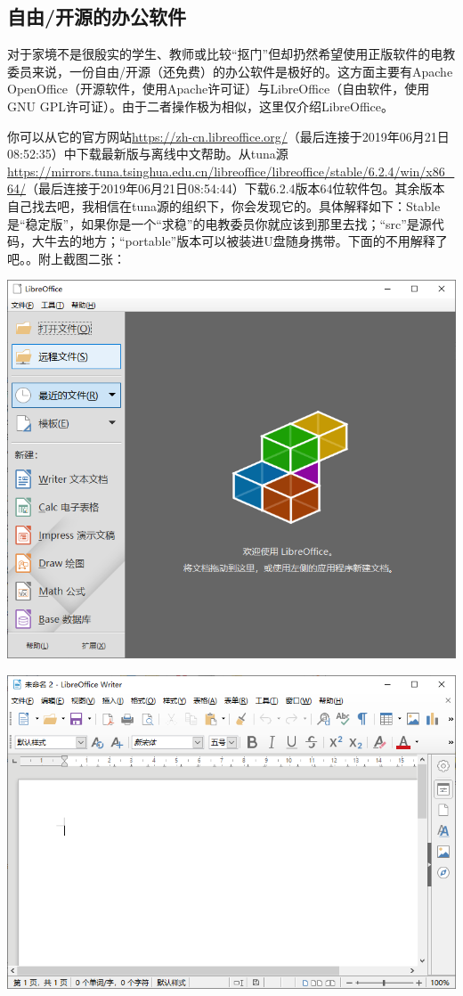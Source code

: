 \subsection{自由/开源的办公软件}
对于家境不是很殷实的学生、教师或比较“抠门”但却扔然希望使用正版软件的电教委员来说，一份自由/开源（还免费）的办公软件是极好的。这方面主要有Apache OpenOffice（开源软件，使用Apache许可证）与LibreOffice（自由软件，使用GNU GPL许可证）。由于二者操作极为相似，这里仅介绍LibreOffice。\par
你可以从它的官方网站\url{https://zh-cn.libreoffice.org/}（最后连接于2019年06月21日08:52:35）中下载最新版与离线中文帮助。从tuna源\url{https://mirrors.tuna.tsinghua.edu.cn/libreoffice/libreoffice/stable/6.2.4/win/x86_64/}（最后连接于2019年06月21日08:54:44）下载6.2.4版本64位软件包。其余版本自己找去吧，我相信在tuna源的组织下，你会发现它的。具体解释如下：Stable是“稳定版”，如果你是一个“求稳”的电教委员你就应该到那里去找；“src”是源代码，大牛去的地方；“portable”版本可以被装进U盘随身携带。下面的不用解释了吧。。附上截图二张：
\begin{center}
	\includegraphics[scale=0.7]{pic/loffice_start}
\end{center} \par
\begin{center}
	\includegraphics[scale=0.7]{pic/loffice_wr}
\end{center} \par
